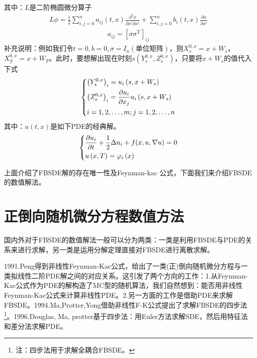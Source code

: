 			其中：$L$是二阶椭圆微分算子
			\begin{align*}
			{L \phi } = \frac{1}{2}\sum\limits_{i,j = 0}^n {{a_{ij}}\left( {t,x} \right)\frac{{{\partial ^2}\phi }}{{\partial {x^i}\partial {x^j}}}}  + \sum\limits_{i,j = 0}^n {{b_i}\left( {t,x} \right)\frac{{\partial \phi }}{{\partial {x^i}}}} \end{align*}
			\begin{align*}
			{a_{ij}} = {\left[ {\sigma {\sigma ^\mathrm{T}}} \right]_{ij}}\end{align*}
			补充说明：例如我们令$t=0,b=0,\sigma=I_n(\text{单位矩阵})$，则$X_s^{0,x}=x+W_s$，$X_T^{0,x}=x+W_T$。此时，要想解出现在时刻$s(Y_s^{0,x},Z_s^{0,x})$，只要将$x+W_s$的值代入下式
					\begin{equation*}
					\centering
					\left\{\begin{lgathered}
					{{{\left( {Y_s^{0,x}} \right)}_i} = {u_i}\left( {s,x + {W_s}} \right)}\\
					{{{\left( {Z_s^{0,x}} \right)}_i} = \frac{{\partial {u_i}}}{{\partial {x_j}}}{u_i}\left( {s,x + {W_s}} \right)}\\
					{i = 1,2, \ldots ,m;j = 1,2, \ldots ,n}
					\end{lgathered} \right.
					\end{equation*}
			其中：$u(t,x)$是如下PDE的经典解。
					\begin{equation*}
					\centering
					\left\{\begin{lgathered}
					{\frac{{\partial u_i}}{{\partial t}} + \frac 12 \Delta u_i + f(x,u,{\nabla u})= 0}\\
					{u\left( {x,T} \right) = \varphi_i \left(x \right)}
			 		\end{lgathered} \right.
			 		\end{equation*}
			 \par
			上面介绍了FBSDE解的存在唯一性及Feynman-kac 公式，下面我们来介绍FBSDE的数值解法。

\section{正倒向随机微分方程数值方法}
	\par
	国内外对于FBSDE的数值解法一般可以分为两类：一类是利用FBSDE与PDE的关系来进行求解，另一类是运用\textcolor[rgb]{1.00,0.00,0.00}{分解定理}直接对FBSDE进行离散求解。
	\par
	1991.Peng\cite{1991.Peng}得到非线性Feynman-Kac公式，给出了一类(正)倒向随机微分方程与一类拟线性二阶PDE解之间的对应关系。这引发了两个方向的工作：1.从Feynman-Kac公式作为PDE的解构造了MC型的随机算法，我们自然想到：能否用非线性Feynman-Kac公式来计算非线性PDE。2.另一方面的工作是借助PDE来求解FBSDE。1994.Ma,Protter,Yong\cite{1994.Ma}借助非线性F-K公式提出了求解FBSDE的四步法\footnote{注：四步法用于求解全耦合FBSDE。}。1996.Douglas, Ma, protter\cite{1996.Douglas}基于四步法：用Euler方法求解SDE，然后用特征法和差分法求解PDE。

